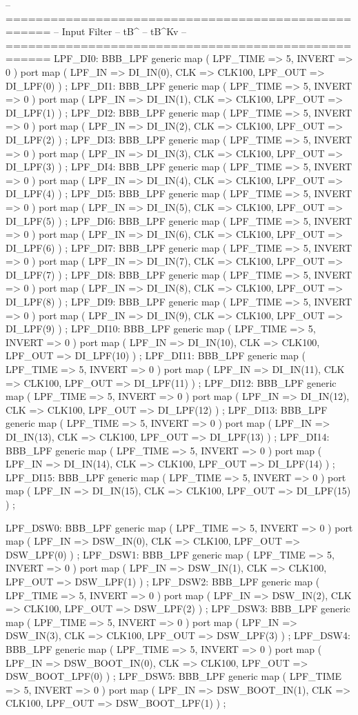 \begin{mylisting}[language=VHDL,caption=トップモジュール,label=appF_Top_module_VHDL]
{{{-- ====================================================
-- Input Filter
--   tB^
--   tB^Kv
-- ====================================================
	LPF_DI0: BBB_LPF	generic map ( LPF_TIME => 5,	INVERT => 0 )	port map ( LPF_IN => DI_IN(0),		CLK => CLK100,		LPF_OUT => DI_LPF(0) ) ;
	LPF_DI1: BBB_LPF	generic map ( LPF_TIME => 5,	INVERT => 0 )	port map ( LPF_IN => DI_IN(1),		CLK => CLK100,		LPF_OUT => DI_LPF(1) ) ;
	LPF_DI2: BBB_LPF	generic map ( LPF_TIME => 5,	INVERT => 0 )	port map ( LPF_IN => DI_IN(2),		CLK => CLK100,		LPF_OUT => DI_LPF(2) ) ;
	LPF_DI3: BBB_LPF	generic map ( LPF_TIME => 5,	INVERT => 0 )	port map ( LPF_IN => DI_IN(3),		CLK => CLK100,		LPF_OUT => DI_LPF(3) ) ;
	LPF_DI4: BBB_LPF	generic map ( LPF_TIME => 5,	INVERT => 0 )	port map ( LPF_IN => DI_IN(4),		CLK => CLK100,		LPF_OUT => DI_LPF(4) ) ;
	LPF_DI5: BBB_LPF	generic map ( LPF_TIME => 5,	INVERT => 0 )	port map ( LPF_IN => DI_IN(5),		CLK => CLK100,		LPF_OUT => DI_LPF(5) ) ;
	LPF_DI6: BBB_LPF	generic map ( LPF_TIME => 5,	INVERT => 0 )	port map ( LPF_IN => DI_IN(6),		CLK => CLK100,		LPF_OUT => DI_LPF(6) ) ;
	LPF_DI7: BBB_LPF	generic map ( LPF_TIME => 5,	INVERT => 0 )	port map ( LPF_IN => DI_IN(7),		CLK => CLK100,		LPF_OUT => DI_LPF(7) ) ;
	LPF_DI8: BBB_LPF	generic map ( LPF_TIME => 5,	INVERT => 0 )	port map ( LPF_IN => DI_IN(8),		CLK => CLK100,		LPF_OUT => DI_LPF(8) ) ;
	LPF_DI9: BBB_LPF	generic map ( LPF_TIME => 5,	INVERT => 0 )	port map ( LPF_IN => DI_IN(9),		CLK => CLK100,		LPF_OUT => DI_LPF(9) ) ;
	LPF_DI10: BBB_LPF	generic map ( LPF_TIME => 5,	INVERT => 0 )	port map ( LPF_IN => DI_IN(10),		CLK => CLK100,		LPF_OUT => DI_LPF(10) ) ;
	LPF_DI11: BBB_LPF	generic map ( LPF_TIME => 5,	INVERT => 0 )	port map ( LPF_IN => DI_IN(11),		CLK => CLK100,		LPF_OUT => DI_LPF(11) ) ;
	LPF_DI12: BBB_LPF	generic map ( LPF_TIME => 5,	INVERT => 0 )	port map ( LPF_IN => DI_IN(12),		CLK => CLK100,		LPF_OUT => DI_LPF(12) ) ;
	LPF_DI13: BBB_LPF	generic map ( LPF_TIME => 5,	INVERT => 0 )	port map ( LPF_IN => DI_IN(13),		CLK => CLK100,		LPF_OUT => DI_LPF(13) ) ;
	LPF_DI14: BBB_LPF	generic map ( LPF_TIME => 5,	INVERT => 0 )	port map ( LPF_IN => DI_IN(14),		CLK => CLK100,		LPF_OUT => DI_LPF(14) ) ;
	LPF_DI15: BBB_LPF	generic map ( LPF_TIME => 5,	INVERT => 0 )	port map ( LPF_IN => DI_IN(15),		CLK => CLK100,		LPF_OUT => DI_LPF(15) ) ;

	LPF_DSW0: BBB_LPF	generic map ( LPF_TIME => 5,	INVERT => 0 )	port map ( LPF_IN => DSW_IN(0),		CLK => CLK100,		LPF_OUT => DSW_LPF(0) ) ;
	LPF_DSW1: BBB_LPF	generic map ( LPF_TIME => 5,	INVERT => 0 )	port map ( LPF_IN => DSW_IN(1),		CLK => CLK100,		LPF_OUT => DSW_LPF(1) ) ;
	LPF_DSW2: BBB_LPF	generic map ( LPF_TIME => 5,	INVERT => 0 )	port map ( LPF_IN => DSW_IN(2),		CLK => CLK100,		LPF_OUT => DSW_LPF(2) ) ;
	LPF_DSW3: BBB_LPF	generic map ( LPF_TIME => 5,	INVERT => 0 )	port map ( LPF_IN => DSW_IN(3),		CLK => CLK100,		LPF_OUT => DSW_LPF(3) ) ;
	LPF_DSW4: BBB_LPF	generic map ( LPF_TIME => 5,	INVERT => 0 )	port map ( LPF_IN => DSW_BOOT_IN(0),		CLK => CLK100,		LPF_OUT => DSW_BOOT_LPF(0) ) ;
	LPF_DSW5: BBB_LPF	generic map ( LPF_TIME => 5,	INVERT => 0 )	port map ( LPF_IN => DSW_BOOT_IN(1),		CLK => CLK100,		LPF_OUT => DSW_BOOT_LPF(1) ) ;

}}}
\end{mylisting}
